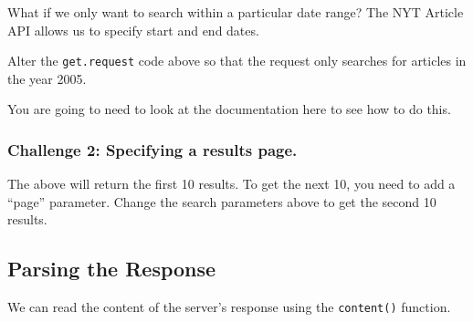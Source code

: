 \documentclass[
]{book}
\begin{document}
What if we only want to search within a particular date range? The NYT Article API allows us to specify start and end dates.

Alter the \texttt{get.request} code above so that the request only searches for articles in the year 2005.

You are going to need to look at the documentation here to see how to do this.

\hypertarget{challenge-2-specifying-a-results-page.}{%
\subsubsection*{Challenge 2: Specifying a results page.}\label{challenge-2-specifying-a-results-page.}}

The above will return the first 10 results. To get the next 10, you need to add a ``page'' parameter. Change the search parameters above to get the second 10 results.

\hypertarget{parsing-the-response}{%
\subsection{Parsing the Response}\label{parsing-the-response}}

We can read the content of the server's response using the \texttt{content()} function.
\end{document}
